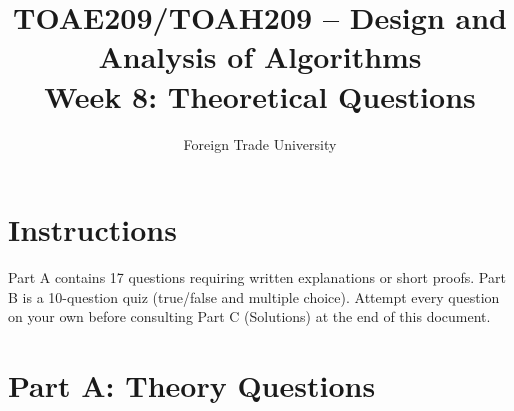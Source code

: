 \documentclass[11pt]{article}
\title{TOAE209/TOAH209 -- Design and Analysis of Algorithms\\[4pt]
\large Week 8: Theoretical Questions}
\author{Foreign Trade University}
\date{}
\begin{document}
\maketitle

\section*{Instructions}

Part A contains 17 questions requiring written explanations or short proofs. Part B is a
10-question quiz (true/false and multiple choice). Attempt every question on your own
before consulting Part C (Solutions) at the end of this document.

\section*{Part A: Theory Questions}
\end{document}
